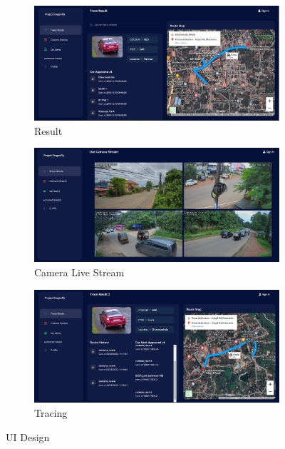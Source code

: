 \begin{figure}[!ht]
	\begin{subfigure}[b]{0.48\linewidth}
		\centering
		\includegraphics[width=\linewidth]{Images/UI/result}
		\caption{Result}
		\label{fig:result}
	\end{subfigure} \hfill
	\begin{subfigure}[b]{0.48\linewidth}
		\centering
		\includegraphics[width=\linewidth]{Images/UI/live_stream}
		\caption{Camera Live Stream}
		\label{fig:result}
	\end{subfigure} \hfill
	\begin{subfigure}[b]{0.48\linewidth}
		\centering
		\includegraphics[width=\linewidth]{Images/UI/tracing}
		\caption{Tracing}
		\label{fig:tracing}
	\end{subfigure}
	\caption{UI Design}
\end{figure}

